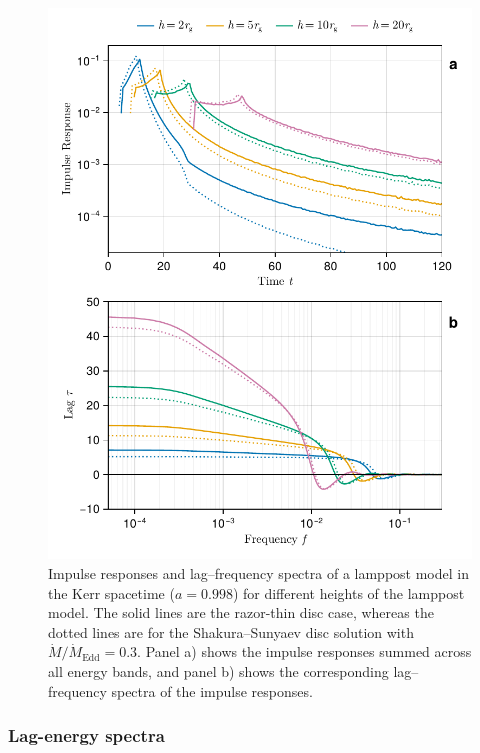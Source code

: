 \documentclass[fleqn,usenatbib]{mnras}
\begin{document}
\begin{figure}
    \centering
    \includegraphics[width=0.98\columnwidth]{figures/reverberation.thin-disc.pdf}
    \caption{Impulse responses and lag--frequency spectra of a lamppost model in
        the Kerr spacetime ($a = 0.998$) for different heights of the lamppost
        model. The solid lines are the razor-thin disc case, whereas the dotted
        lines are for the Shakura--Sunyaev disc solution with $\dot{M} /
        \dot{M}_\text{Edd} = 0.3$. Panel a) shows the impulse responses summed
        across all energy bands, and panel b) shows the corresponding lag--frequency
        spectra of the impulse responses. }
    \label{fig:reverberation-thin}
\end{figure}


\subsubsection{Lag-energy spectra}
\end{document}
